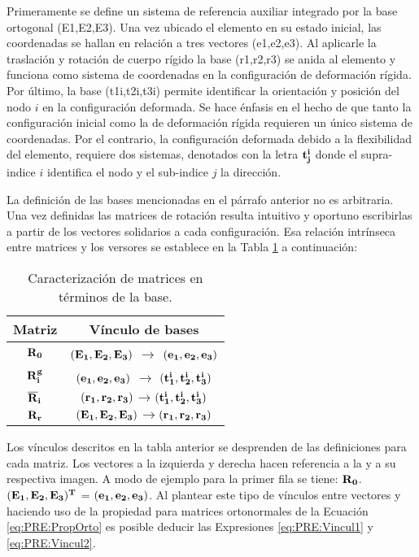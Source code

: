 Primeramente se define un sistema de referencia auxiliar integrado por la base ortogonal (\gls{E1},\gls{E2},\gls{E3}). Una vez ubicado el elemento en su estado inicial, las coordenadas se hallan en relación a tres vectores (\gls{e1},\gls{e2},\gls{e3}). Al aplicarle la traslación y rotación de cuerpo rígido la base (\gls{r1},\gls{r2},\gls{r3}) se anida al elemento y funciona como sistema de coordenadas en la configuración de deformación rígida. Por último, la base (\gls{t1i},\gls{t2i},\gls{t3i}) permite identificar la orientación y posición del nodo $i$ en la configuración deformada. Se hace énfasis en el hecho de que tanto la configuración inicial como la de deformación rígida requieren un único sistema de coordenadas. Por el contrario, la configuración deformada debido a la flexibilidad del elemento, requiere dos sistemas, denotados con la letra $\bf{t}_j^i$ donde el supra-indice $i$ identifica el nodo y el sub-indice $j$ la dirección.


La definición de las bases mencionadas en el párrafo anterior no es arbitraria. Una vez definidas las matrices de rotación resulta intuitivo y oportuno escribirlas a partir de los vectores solidarios a cada configuración. Esa relación intrínseca entre matrices y los versores se establece en la Tabla \ref{Table:PRE:RelacionVM} a continuación: 

\begin{table}[htbp]
	\begin{center}
		\begin{tabular}{|c|c|}
			\hline
			Matriz & Vínculo de bases \\
			\hline \hline
			$\bf{R}_0$ &$(\bf{E_1},\bf{E_2},\bf{E_3})$ $\rightarrow$
			$(\bf{e_1},\bf{e_2},\bf{e_3})$   \\ \hline
			$\bf{R}_i^g$ & $(\bf{e_1},\bf{e_2},\bf{e_3})$ $\rightarrow$
			$(\bf{t_1^i},\bf{t_2^i},\bf{t_3^i})$ \\ \hline
			$\bf{\overline{R}}_i$ &
			$(\bf{r_1},\bf{r_2},\bf{r_3})$$\rightarrow$$(\bf{t_1^i},\bf{t_2^i},\bf{t_3^i})$
			\\ \hline
			$\bf{R}_r$ &
			$(\bf{E_1},\bf{E_2},\bf{E_3})$$\rightarrow$$(\bf{r_1},\bf{r_2},\bf{r_3})$ \\
			\hline
		\end{tabular}
		\caption{Caracterización de matrices en términos de la base.}
		\label{Table:PRE:RelacionVM}
	\end{center}
\end{table}


Los vínculos descritos en la tabla anterior se desprenden de las definiciones para cada matriz. Los vectores a la izquierda y derecha hacen referencia a la y a su respectiva imagen. A modo de ejemplo para la primer fila se tiene: $\bf{R}_0$. $(\bf{E_1},\bf{E_2},\bf{E_3})^T$ = $(\bf{e_1},\bf{e_2},\bf{e_3})$. Al plantear este tipo de vínculos entre vectores y haciendo uso de la propiedad para matrices ortonormales de la Ecuación \ref{eq:PRE:PropOrto} es posible deducir las Expresiones \eqref{eq:PRE:Vincul1} y \eqref{eq:PRE:Vincul2}.


